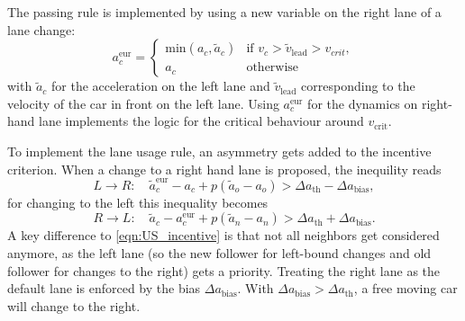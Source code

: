 The passing rule is implemented by using a new variable on the right lane of a lane change:
\begin{equation}
  a_c^\text{eur} = 
  \begin{cases}
    \text{min}(a_c, \tilde{a}_c) & \text{if } v_c > \tilde v_\text{lead} > v_{crit}, \\
    a_c                         & \text{otherwise}
  \end{cases}
\end{equation}
with $\tilde a_c$ for the acceleration on the left lane and $\tilde v_\text{lead}$ corresponding to the velocity of
the car in front on the left lane.
Using $a_c^\text{eur}$ for the dynamics on right-hand lane implements the logic for the critical behaviour around
$v_\text{crit}$.

To implement the lane usage rule, an asymmetry gets added to the incentive criterion. When a change to a right hand
lane is proposed, the inequility reads
\begin{equation}
  L \rightarrow R: \quad
  \tilde a_c^\text{eur} - a_c + p (\tilde a_o - a_o) > \Delta a_\text{th} - \Delta a_\text{bias},
\end{equation}
for changing to the left this inequality becomes
\begin{equation}
  R \rightarrow L: \quad
  \tilde a_c - a_c^\text{eur} + p (\tilde a_n - a_n) > \Delta a_\text{th} + \Delta a_\text{bias}.
\end{equation}
A key difference to \autoref{eqn:US_incentive} is that not all neighbors get considered anymore, as the left lane
(so the new follower for left-bound changes and old follower for changes to the right) gets a priority. Treating
the right lane as the default lane is enforced by the bias $\Delta a_\text{bias}$. With 
$\Delta a_\text{bias} > \Delta a_\text{th}$, a free moving car will change to the right.


